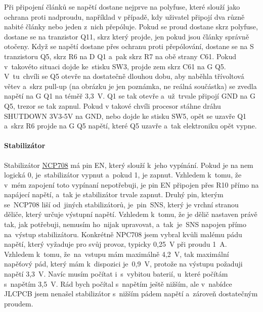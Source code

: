 Při připojení článků se napětí dostane nejprve na polyfuse, %
které slouží jako ochrana proti nadproudu, například v případě, kdy uživatel připojí dva 
různě nabité články nebo jeden z~nich přepóluje.
Pokud se proud dostane skrz polyfuse, dostane se na tranzistor Q11, skrz který projde, jen pokud jsou články správně otočeny.
Když se napětí dostane přes ochranu proti přepólování, dostane se na S tranzistoru Q5, skrz R6 na D Q1 a~pak skrz R7 na obě strany C61.
Pokud v~takovéto situaci dojde ke~stisku SW3, projde zem skrz C61 na G Q5. V~tu~chvíli se Q5 otevře na dostatečně dlouhou dobu, 
aby naběhla třívoltová větev a~skrz pull-up (na obrázku je jen poznámka, ne reálná součástka) se zvedla napětí na G Q1 na téměř 3,3~V. 
Q1 se tak otevře a~už~trvale připojí GND na G Q5, trezor se tak zapnul. Pokud v takové chvíli procesor stáhne dráhu SHUTDOWN 3V3-5V 
na GND, nebo dojde ke stisku SW5, opět se uzavře Q1 a~skrz R6 projde na G Q5 napětí, které Q5 uzavře a~tak elektroniku opět vypne.

\newpage

\paragraph*{Stabilizátor}

Stabilizátor \href{https://datasheet.lcsc.com/szlcsc/ON-Semicon-ON-NCP708MU330TAG_C183178.pdf}{NCP708} má pin EN, který slouží k~jeho vypínání. 
Pokud je na nem logická 0, je~stabilizátor vypnut a~pokud 1, je zapnut. Vzhledem k~tomu, že v~mém zapojení toto vypínaní nepotřebuji, je pin EN připojen 
přes R10 přímo na napájecí napětí, a~tak je stabilizátor trvale zapnut. Druhý pin, kterým se~NCP708 liší od~jiných stabilizátorů, je~pin~SNS, 
který je vrchní stranou děliče, který určuje výstupní napětí. Vzhledem k~tomu, že je dělič nastaven právě tak, jak potřebuji, nemusím ho~nijak 
upravovat, a~tak~je~SNS napojen přímo na~výstup stabilizátoru. %
Konkrétně NPC708 jsem vybral kvůli malému pádu napětí, který vyžaduje pro svůj provoz, typicky 0,25~V při proudu 1~A. Vzhledem k~tomu, že~na~vstupu 
mám maximálně 4,2~V, tak maximální napěťový pád, který mám k~dispozici je~0,9~V, protože na výstupu požaduji napětí 3,3~V. Navíc musím počítat 
i~s~vybitou baterií, u~které počítám s~napětím 3,5~V. Rád bych počítal s~napětím ještě nižším, ale v~nabídce JLCPCB jsem nenašel stabilizátor 
s~nižším pádem napětí a~zároveň dostatečným proudem. 

